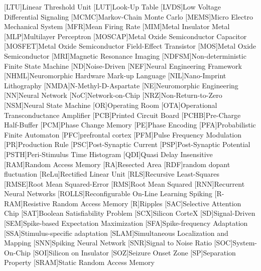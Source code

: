 \begin{acronym}
[LTU]{Linear Threshold Unit}
[LUT]{Look-Up Table}
[LVDS]{Low Voltage Differential Signaling}
[MCMC]{Markov-Chain Monte Carlo}
[MEMS]{Micro Electro Mechanical System}
[MFR]{Mean Firing Rate}
[MIM]{Metal Insulator Metal}
[MLP]{Multilayer Perceptron}
[MOSCAP]{Metal Oxide Semiconductor Capacitor}
[MOSFET]{Metal Oxide Semiconductor Field-Effect Transistor}
[MOS]{Metal Oxide Semiconductor}
[MRI]{Magnetic Resonance Imaging}
[NDFSM]{Non-deterministic Finite State Machine} 
[ND]{Noise-Driven}
[NEF]{Neural Engineering Framework}
[NHML]{Neuromorphic Hardware Mark-up Language}
[NIL]{Nano-Imprint Lithography}
[NMDA]{N-Methyl-D-Aspartate}
[NE]{Neuromorphic Engineering}
[NN]{Neural Network}
[NoC]{Network-on-Chip}
[NRZ]{Non-Return-to-Zero}
[NSM]{Neural State Machine}
[OR]{Operating Room}
[OTA]{Operational Transconductance Amplifier}
[PCB]{Printed Circuit Board}
[PCHB]{Pre-Charge Half-Buffer}
[PCM]{Phase Change Memory}
[PE]{Phase Encoding}
[PFA]{Probabilistic Finite Automaton}
[PFC]{prefrontal cortex}
[PFM]{Pulse Frequency Modulation}
[PR]{Production Rule}
[PSC]{Post-Synaptic Current}
[PSP]{Post-Synaptic Potential}
[PSTH]{Peri-Stimulus Time Histogram}
[QDI]{Quasi Delay Insensitive}
[RAM]{Random Access Memory}
[RA]{Resected Area}
[RDF]{random dopant fluctuation}
[ReLu]{Rectified Linear Unit}
[RLS]{Recursive Least-Squares}
[RMSE]{Root Mean Squared-Error}
[RMS]{Root Mean Squared}
[RNN]{Recurrent Neural Networks}
[ROLLS]{Reconfigurable On-Line Learning Spiking}
[R-RAM]{Resistive Random Access Memory}
[R]{Ripples}
[SAC]{Selective Attention Chip}
[SAT]{Boolean Satisfiability Problem}
[SCX]{Silicon CorteX}
[SD]{Signal-Driven}
[SEM]{Spike-based Expectation Maximization}
[SFA]{Spike-frequency Adaptation}
[SSA]{Stimulus-specific adaptation}
[SLAM]{Simultaneous Localization and Mapping}
[SNN]{Spiking Neural Network}
[SNR]{Signal to Noise Ratio}
[SOC]{System-On-Chip}
[SOI]{Silicon on Insulator}
[SOZ]{Seizure Onset Zone}
[SP]{Separation Property}
[SRAM]{Static Random Access Memory}

\end{acronym}
